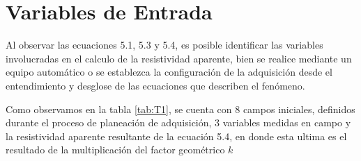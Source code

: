 \section{Variables de Entrada}
	Al observar las ecuaciones 5.1, 5.3 y 5.4, es posible identificar las variables involucradas en el calculo de la resistividad aparente, bien se realice mediante un equipo automático o se establezca la configuración de la adquisición desde el entendimiento y desglose de las ecuaciones que describen el fenómeno.
		
	Como observamos en la tabla \ref{tab:T1}, se cuenta con 8 campos iniciales, definidos durante el proceso de planeación de adquisición, 3 variables medidas en campo y la resistividad aparente resultante de la ecuación 5.4, en donde esta ultima es el resultado de la multiplicación del factor geométrico $k$ 
	
